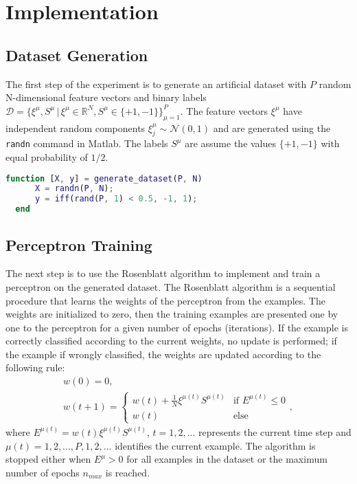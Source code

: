 \section{Implementation}

\subsection{Dataset Generation}
The first step of the experiment is to generate an artificial dataset with $P$ random N-dimensional feature vectors and binary labels $\mathcal{D} = \{ \xi^\mu, S^\mu \,|\, \xi^\mu \in \mathds{R}^N, S^\mu \in \{+1, -1\} \}_{\mu=1}^P$.
The feature vectors $\xi^\mu$ have independent random components $\xi_j^\mu \sim \mathcal{N}(0, 1)$ and are generated using the \texttt{randn} command in Matlab.
The labels $S^\mu$ are assume the values $\{+1, -1\}$ with equal probability of $1/2$.

\begin{lstlisting}[language=Matlab]
  function [X, y] = generate_dataset(P, N)
      X = randn(P, N);
      y = iff(rand(P, 1) < 0.5, -1, 1);
  end
\end{lstlisting}

\subsection{Perceptron Training}
The next step is to use the Rosenblatt algorithm to implement and train a perceptron on the generated dataset.
The Rosenblatt algorithm is a sequential procedure that learns the weights of the perceptron from the examples.
The weights are initialized to zero, then the training examples are presented one by one to the perceptron for a given number of epochs (iterations).
If the example is correctly classified according to the current weights, no update is performed;
if the example if wrongly classified, the weights are updated according to the following rule:
\begin{gather*} 
    w(0) = 0, \\
    w(t + 1) =  \begin{cases}
                    w(t) + \frac{1}{N} \xi^{\mu(t)} S^{\mu(t)} &\text{if $E^{\mu(t)} \leq 0$}\\
                    w(t) &\text{else}
                \end{cases},
\end{gather*}
where $E^{\mu(t)} = w(t) \xi^{\mu(t)} S^{\mu(t)}$, $t = 1, 2, ...$ represents the current time step and $\mu(t) = 1, 2, ..., P, 1, 2, ...$ identifies the current example.
The algorithm is stopped either when $E^\mu > 0$ for all examples in the dataset or the maximum number of epochs $n_{max}$ is reached.

